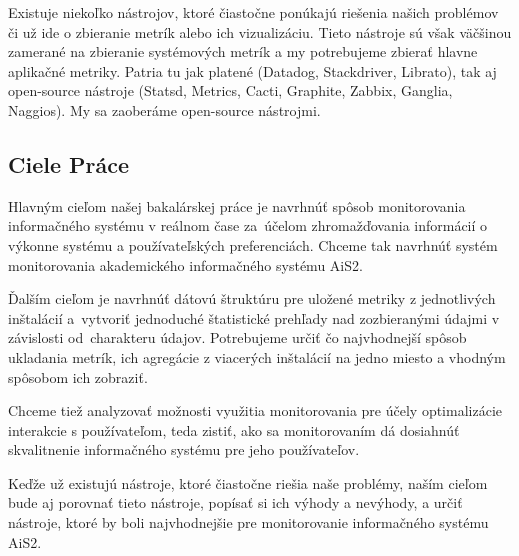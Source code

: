 \documentclass[a4paper, usesections, upjsfrontpage, thesismargins, thesislinespacing, twoside]{rnthesissvk}
\begin{document}
Existuje niekoľko nástrojov, ktoré čiastočne ponúkajú riešenia našich problémov či už ide o zbieranie metrík alebo ich vizualizáciu.
Tieto nástroje sú však väčšinou zamerané na zbieranie systémových metrík a my potrebujeme zbierať hlavne aplikačné metriky.
Patria tu jak platené (Datadog, Stackdriver, Librato), tak aj open-source nástroje (Statsd, Metrics, Cacti, Graphite, Zabbix, Ganglia, Naggios).
My sa zaoberáme open-source nástrojmi.


\subsection{Ciele Práce}


Hlavným cieľom našej bakalárskej práce je navrhnúť spôsob monitorovania informačného systému v reálnom čase za~úče\-lom zhromažďovania informácií o výkonne systému a používateľských pre\-ferenciách. 
Chceme tak navrhnúť systém monitorovania akademického informačného systému AiS2.

Ďalším cieľom je navrhnúť dátovú štruktúru pre uložené metriky z jednotlivých inštalácií a~vytvoriť jednoduché štatistické prehľady nad zozbieranými údajmi v závis\-losti od~charakteru údajov.
Potrebujeme určiť čo najvhodnejší spôsob ukladania metrík, ich agregácie z viacerých inštalácií na jedno miesto a vhodným spôsobom ich zobraziť.

Chceme tiež analyzovať možnosti využitia monitorovania pre účely optimalizácie interakcie s používateľom, teda zistiť, ako sa monitorovaním dá dosiahnúť skvalitnenie informačného systému pre jeho používateľov.

Keďže už existujú nástroje, ktoré čiastočne riešia naše problémy, naším cieľom bude aj porovnať tieto nástroje, popísať si ich výhody a nevýhody, a určiť nástroje, ktoré by boli najvhodnejšie pre monitorovanie informačného systému AiS2.
\end{document}
